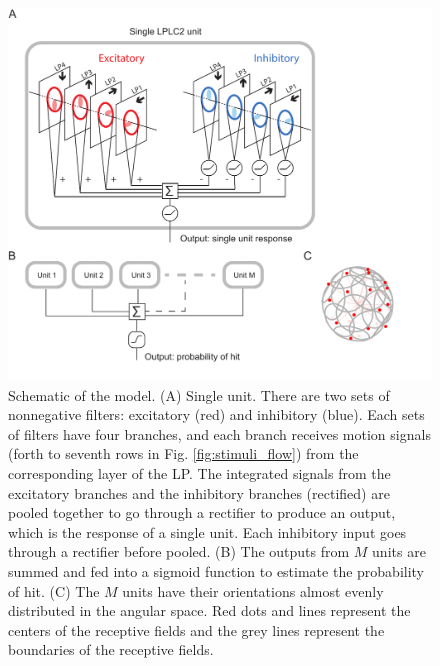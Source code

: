 \documentclass[pdftex,9pt,lineno]{elife}
\begin{document}
\begin{figure}
\includegraphics[width=\linewidth]{figures/model_sketch_paper.pdf}
\caption{Schematic of the model. (A) Single unit. There are two sets of nonnegative filters: excitatory (red) and inhibitory (blue). Each sets of filters have four branches, and each branch receives motion signals (forth to seventh rows in Fig. \ref{fig:stimuli_flow}) from the corresponding layer of the LP. The integrated signals from the excitatory branches and the inhibitory branches (rectified) are pooled together to go through a rectifier to produce an output, which is the response of a single unit. Each inhibitory input goes through a rectifier before pooled. (B) The outputs from $M$ units are summed and fed into a sigmoid function to estimate the probability of hit. (C) The $M$ units have their orientations almost evenly distributed in the angular space. Red dots and lines represent the centers of the receptive fields and the grey lines represent the boundaries of the receptive fields.}
\label{fig:model}

\end{figure}
\end{document}
